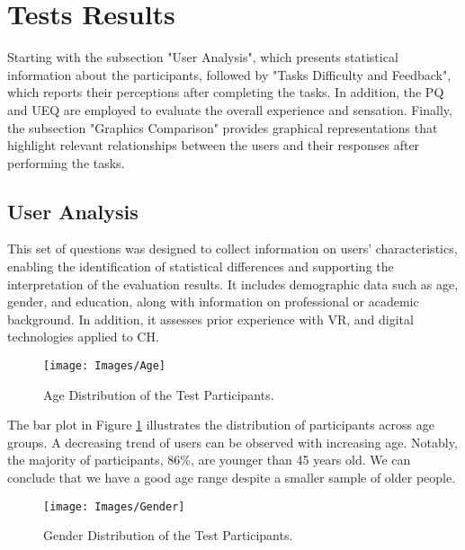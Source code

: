 \section{Tests Results}
\label{sec:results}

Starting with the subsection "User Analysis", which presents statistical information about the participants, followed by "Tasks Difficulty and Feedback", which reports their perceptions after completing the tasks.
In addition, the \gls{PQ} and \gls{UEQ} are employed to evaluate the overall experience and sensation. Finally, the subsection "Graphics Comparison" provides graphical representations that highlight relevant relationships between the users and their responses after performing the tasks.
\subsection{User Analysis}

This set of questions was designed to collect information on users' characteristics, enabling the identification of statistical differences and supporting the interpretation of the evaluation results. 
It includes demographic data such as age, gender, and education, along with information on professional or academic background.
In addition, it assesses prior experience with \gls{VR}, and digital technologies applied to \gls{CH}.

\begin{figure}[h!]
    \centering
    \texttt{[image: Images/Age]}
    \caption{Age Distribution of the Test Participants.} 
    \label{fig:age}
\end{figure}

The bar plot in Figure \ref{fig:age} illustrates the distribution of participants across age groups. A decreasing trend of users can be observed with increasing age. Notably, the majority of participants, 86\%, are younger than 45 years old.
We can conclude that we have a good age range despite a smaller sample of older people.

\begin{figure}[h!]
    \centering
    \texttt{[image: Images/Gender]}
    \caption{Gender Distribution of the Test Participants.} 
    \label{fig:gender}
\end{figure}

